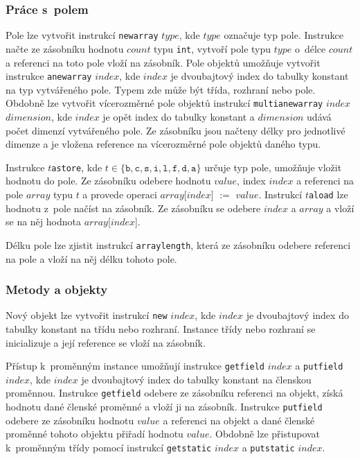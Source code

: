 \subsubsection{Práce s~polem}

Pole lze vytvořit instrukcí \texttt{newarray} $type$, kde $type$ označuje typ pole. Instrukce načte ze zásobníku hodnotu $count$ typu \texttt{int}, vytvoří pole typu $type$ o~délce $count$ a referenci na toto pole vloží na zásobník. Pole objektů umožňuje vytvořit instrukce \texttt{anewarray} $index$, kde $index$ je dvoubajtový index do tabulky konstant na typ vytvářeného pole. Typem zde může být třída, rozhraní nebo pole. Obdobně lze vytvořit vícerozměrné pole objektů instrukcí \texttt{multianewarray} $index$ $dimension$, kde $index$ je opět index do tabulky konstant a $dimension$ udává počet dimenzí vytvářeného pole. Ze zásobníku jsou načteny délky pro jednotlivé dimenze a je vložena reference na vícerozměrné pole objektů daného typu.

Instrukce $t$\texttt{astore}, kde $t \in \{\texttt{b}, \texttt{c}, \texttt{s}, \texttt{i}, \texttt{l}, \texttt{f},  \texttt{d}, \texttt{a}  \}$ určuje typ pole, umožňuje vložit hodnotu do pole. Ze zásobníku odebere hodnotu $value$, index $index$ a referenci na pole $array$ typu $t$ a provede operaci $array$[$index$] $:=$ $value$.
Instrukcí $t$\texttt{aload} lze hodnotu z~pole načíst na zásobník. Ze zásobníku se odebere $index$ a $array$ a vloží se na něj hodnota $array$[$index$]. 

Délku pole lze zjistit instrukcí \texttt{arraylength}, která ze zásobníku odebere referenci na pole a vloží na něj délku tohoto pole.

\subsubsection{Metody a objekty}

Nový objekt lze vytvořit instrukcí \texttt{new} $index$, kde $index$ je dvoubajtový index do tabulky konstant na třídu nebo rozhraní. Instance třídy nebo rozhraní se inicializuje a její reference se vloží na zásobník.

Přístup k~proměnným instance umožňují instrukce \texttt{getfield} $index$ a \texttt{putfield} $index$, kde $index$ je dvoubajtový index do tabulky konstant na členskou proměnnou. Instrukce \texttt{getfield} odebere ze zásobníku referenci na objekt, získá hodnotu dané členské proměnné a vloží ji na zásobník. Instrukce \texttt{putfield} odebere ze zásobníku hodnotu $value$ a referenci na objekt a dané členské proměnné tohoto objektu přiřadí hodnotu $value$. Obdobně lze přistupovat k~proměnným třídy pomocí instrukcí \texttt{getstatic} $index$ a \texttt{putstatic} $index$.

